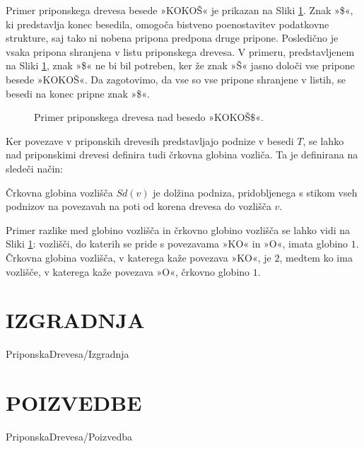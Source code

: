 Primer priponskega drevesa besede »KOKOŠ« je prikazan na Sliki \ref{fig:PriponskoDrevo}. Znak »\$«, ki predstavlja konec besedila, omogoča bistveno poenostavitev podatkovne strukture, saj tako ni nobena pripona predpona druge pripone. Posledično je vsaka pripona shranjena v listu priponskega drevesa. V primeru, predstavljenem na Sliki \ref{fig:PriponskoDrevo}, znak »\$« ne bi bil potreben, ker že znak »Š« jasno določi vse pripone besede »KOKOŠ«. Da zagotovimo, da vse so vse pripone shranjene v listih, se besedi na konec pripne znak »\$«.

\begin{figure}[htb]
    \begin{center}
        
        \caption{Primer priponskega drevesa nad besedo »KOKOŠ$\$$«.} 
        \label{fig:PriponskoDrevo}
    \end{center}
\end{figure}


%
%
Ker povezave v priponskih drevesih predstavljajo podnize v besedi $T$, se lahko nad priponskimi drevesi definira tudi črkovna globina vozliča. Ta je definirana na sledeči način:



\begin{defi}
    Črkovna globina vozlišča $Sd(v)$ je dolžina podniza, pridobljenega s stikom vseh podnizov na povezavah na poti od korena drevesa do vozlišča $v$. 
\end{defi}

Primer razlike med globino vozlišča in črkovno globino vozlišča se lahko vidi na Sliki \ref{fig:PriponskoDrevo}: vozlišči, do katerih se pride s povezavama »KO« in »O«, imata globino $1$. Črkovna globina vozlišča, v katerega kaže povezava »KO«, je $2$, medtem ko ima vozlišče, v katerega kaže povezava »O«, črkovno globino $1$. 

\section{IZGRADNJA}\label{sec:izgradnja}
{PriponskaDrevesa/Izgradnja}

\section{POIZVEDBE}\label{sec:poizvedba}
{PriponskaDrevesa/Poizvedba}